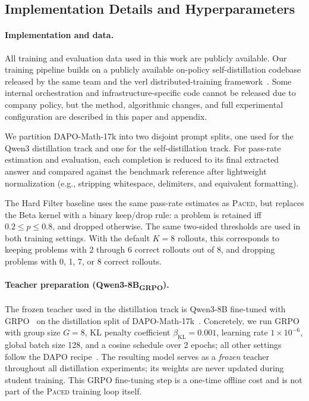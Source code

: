 \documentclass{article}
\begin{document}
\subsection{Implementation Details and Hyperparameters}
\label{app:hyperparameters}
\paragraph{Implementation and data.}
All training and evaluation data used in this work are publicly available. Our training pipeline builds on a publicly available on-policy self-distillation codebase released by the same team and the verl distributed-training framework~\citep{sheng2024hybridflow}. Some internal orchestration and infrastructure-specific code cannot be released due to company policy, but the method, algorithmic changes, and full experimental configuration are described in this paper and appendix.

We partition DAPO-Math-17k into two disjoint prompt splits, one used for the Qwen3 distillation track and one for the self-distillation track. For pass-rate estimation and evaluation, each completion is reduced to its final extracted answer and compared against the benchmark reference after lightweight normalization (e.g., stripping whitespace, delimiters, and equivalent formatting).

The Hard Filter baseline uses the same pass-rate estimates as \textsc{Paced}, but replaces the Beta kernel with a binary keep/drop rule: a problem is retained iff $0.2 \leq p \leq 0.8$, and dropped otherwise. The same two-sided thresholds are used in both training settings. With the default $K{=}8$ rollouts, this corresponds to keeping problems with 2 through 6 correct rollouts out of 8, and dropping problems with 0, 1, 7, or 8 correct rollouts.

\paragraph{Teacher preparation (Qwen3-8B\textsubscript{GRPO}).}
The frozen teacher used in the distillation track is Qwen3-8B fine-tuned with GRPO~\citep{shao2024deepseekmath} on the distillation split of DAPO-Math-17k~\citep{yu2025dapo}.
Concretely, we run GRPO with group size $G{=}8$, KL penalty coefficient $\beta_{\mathrm{KL}}{=}0.001$, learning rate $1{\times}10^{-6}$, global batch size 128, and a cosine schedule over 2 epochs; all other settings follow the DAPO recipe~\citep{yu2025dapo}.
The resulting model serves as a \emph{frozen} teacher throughout all distillation experiments; its weights are never updated during student training.
This GRPO fine-tuning step is a one-time offline cost and is not part of the \textsc{Paced} training loop itself.
\end{document}
